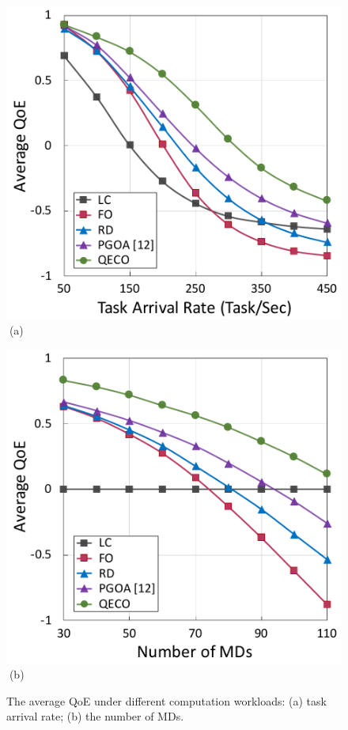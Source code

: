 \documentclass[12pt,draftclsnofoot,onecolumn]{IEEEtran}
\begin{document}
\begin{figure}[tbp]
	\centering
	\captionsetup{name=Fig.}
	\begin{minipage}[b]{0.340\linewidth}
		\centering
		\includegraphics[width=\textwidth]{Fig/qoe_1} 		
		\textcolor{white}{i}\hspace{0.6cm}(a)
	\end{minipage}
	\hspace{-0.2cm}
	\begin{minipage}[b]{0.340\linewidth}
		\includegraphics[width=\textwidth]{Fig/qoe_2}
		\textcolor{white}{i}\hspace{0.6cm}(b)
	\end{minipage}
	\caption{The average QoE under different computation workloads: (a) task arrival rate; (b) the number of MDs.}
	\label{chart4}
\end{figure} 
\end{document}
